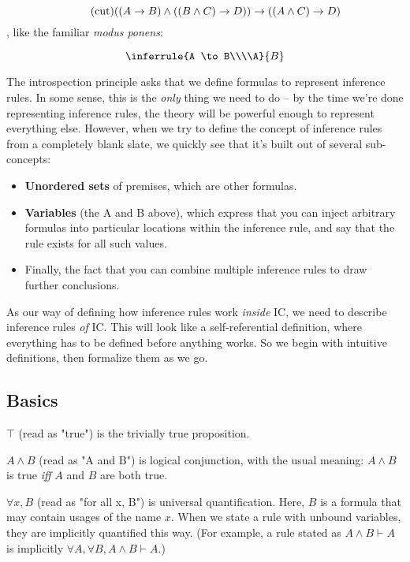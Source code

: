 \documentclass{article}
\begin{document}
  \begin{equation*}
    \tag{cut}
    ((A \to B) \wedge ((B \wedge C) \to D)) \to ((A \wedge C) \to D)\\
  \end{equation*}
  , like the familiar \emph{modus ponens}:
  
  \begin{equation*}
    \inferrule{A \to B\\\\A}{B}
  \end{equation*}
  
  The introspection principle asks that we define formulas to represent inference rules.
  In some sense, this is the \emph{only} thing we need to do – by the time we're done representing inference rules, the theory will be powerful enough to represent everything else.
  However, when we try to define the concept of inference rules from a completely blank slate, we quickly see that it's built out of several sub-concepts:
  \begin{itemize}
    \item \textbf{Unordered sets} of premises, which are other formulas.
    \item \textbf{Variables} (the A and B above), which express that you can inject arbitrary formulas into particular locations within the inference rule, and say that the rule exists for all such values.
    \item Finally, the fact that you can combine multiple inference rules to draw further conclusions.
  \end{itemize}
  
  As our way of defining how inference rules work \emph{inside} IC, we need to describe inference rules \emph{of} IC. This will look like a self-referential definition, where everything has to be defined before anything works. So we begin with intuitive definitions, then formalize them as we go.
    
  \subsection{Basics}
  
  $\top$ (read as "true") is the trivially true proposition.
  
  $A \wedge B$ (read as "A and B") is logical conjunction, with the usual meaning: $A \wedge B$ is true \emph{iff} $A$ and $B$ are both true.

  \newcommand{\objto}{\hookrightarrow}
  $\forall x, B$ (read as "for all x, B") is universal quantification. Here, $B$ is a formula that may contain usages of the name $x$. When we state a rule with unbound variables, they are implicitly quantified this way. (For example, a rule stated as $A \wedge B \vdash A$ is implicitly $\forall A, \forall B, A \wedge B \vdash A$.)
  
\end{document}
